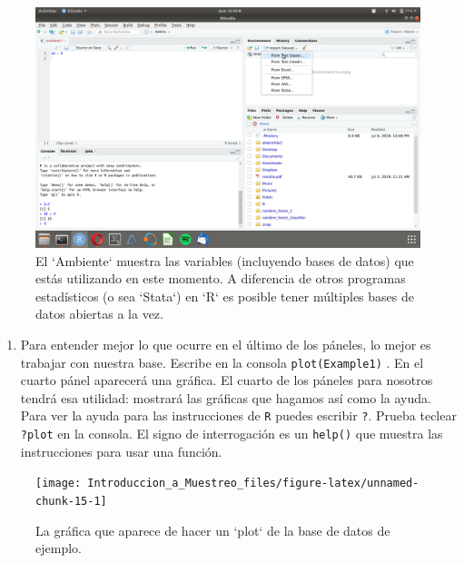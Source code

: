 \documentclass[
]{book}
\providecommand{\tightlist}{%
  \setlength{\itemsep}{0pt}\setlength{\parskip}{0pt}}
\begin{document}
\begin{figure}

{\centering \includegraphics[width=40in]{images/RStudio6} 

}

\caption{El `Ambiente` muestra las variables (incluyendo bases de datos) que estás utilizando en este momento. A diferencia de otros programas estadísticos (o sea `Stata`) en `R` es posible tener múltiples bases de datos abiertas a la vez.}\label{fig:unnamed-chunk-14}
\end{figure}

\begin{enumerate}
\def\labelenumi{\arabic{enumi}.}
\setcounter{enumi}{3}
\tightlist
\item
  Para entender mejor lo que ocurre en el último de los páneles, lo mejor es trabajar con nuestra base. Escribe en la consola \texttt{plot(Example1)} . En el cuarto pánel aparecerá una gráfica. El cuarto de los páneles para nosotros tendrá esa utilidad: mostrará las gráficas que hagamos así como la ayuda. Para ver la ayuda para las instrucciones de \texttt{R} puedes escribir \texttt{?}. Prueba teclear \texttt{?plot} en la consola. El signo de interrogación es un \texttt{help()} que muestra las instrucciones para usar una función.
\end{enumerate}

\begin{figure}

{\centering \texttt{[image: Introduccion\_a\_Muestreo\_files/figure-latex/unnamed-chunk-15-1]} 

}

\caption{La gráfica que aparece de hacer un `plot` de la base de datos de ejemplo.}\label{fig:unnamed-chunk-15}
\end{figure}
\end{document}
